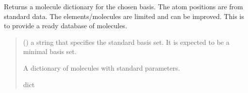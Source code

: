 \documentclass[letterpaper,10pt,english]{sphinxmanual}
\begin{document}
\begin{fulllineitems}
\label{\detokenize{api:MSTOOptpar.moldict}}
\pysigstartsignatures
\pysiglinewithargsret
{}
{}
{}
\pysigstopsignatures
\sphinxAtStartPar
Returns a  molecule dictionary for the chosen basis. The atom positions are from standard data. The elements/molecules are limited and can be improved. This is to provide a ready database of molecules.
\begin{quote}\begin{description}
\sphinxAtStartPar
{} () \textendash{} a string that specifies the standard basis set. It is expected to be a minimal basis set.

\sphinxAtStartPar
A dictionary of molecules with standard parameters.

\sphinxAtStartPar
dict

\end{description}\end{quote}


\end{fulllineitems}
\end{document}

